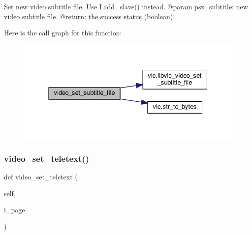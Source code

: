 \begin{DoxyVerb}Set new video subtitle file.
\deprecated Use L{add_slave}() instead.
@param psz_subtitle: new video subtitle file.
@return: the success status (boolean).
\end{DoxyVerb}
 Here is the call graph for this function\+:
\nopagebreak
\begin{figure}[H]
\begin{center}
\leavevmode
\includegraphics[width=331pt]{classvlc_1_1_media_player_ae40ff9e2747b2ae1910f3c302776b242_cgraph}
\end{center}
\end{figure}
\mbox{\label{classvlc_1_1_media_player_a6ae8dbb8920db989e75b4fe94b0a3df7}} 
\subsubsection{\texorpdfstring{video\+\_\+set\+\_\+teletext()}{video\_set\_teletext()}}
{\footnotesize\ttfamily def video\+\_\+set\+\_\+teletext (\begin{DoxyParamCaption}\item[{}]{self,  }\item[{}]{i\+\_\+page }\end{DoxyParamCaption})}

